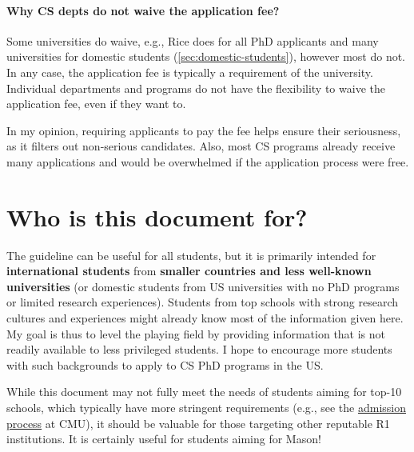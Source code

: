 \documentclass[oneside,11pt,dvipsnames]{book}
\def\sectioninfo#1{%
  \addcontentsline{toc}{sectioninfo}{%
    \noexpand\numberline{}\color{black}{#1}}%
}
\newcommand{\mycomment}[3][\color{blue}]{{#1{{#2}: {#3}}}}
\newcommand{\didi}[1]{\mycomment{Didier}{#1}}{}
\begin{document}


\paragraph{Why CS depts do not waive the application fee?}  Some universities do waive, e.g., Rice does for all PhD applicants and many universities for domestic students (\autoref{sec:domestic-students}), however most do not.  In any case, the application fee is typically a requirement of the university. Individual departments and programs do not have the flexibility to waive the application fee, even if they want to.

In my opinion, requiring applicants to pay the fee helps ensure their seriousness, as it filters out non-serious candidates. Also, most CS programs already receive many applications and would be overwhelmed if the application process were free.


\section{Who is this document for?}
\sectioninfo{This document is mainly intended for international students from smaller countries and domestic students from less well-known universities.}

The guideline can be useful for all students, but it is primarily intended for \textbf{international students} from \textbf{smaller countries and less well-known universities} (or domestic students from US universities with no PhD programs or limited research experiences). 
Students from top schools with strong research cultures and experiences might already know most of the information given here.
My goal is thus to level the playing field by providing information that is not readily available to less privileged students. 
I hope to encourage more students with such backgrounds to apply to CS PhD programs in the US.

While this document may not fully meet the needs of students aiming for top-10 schools, which typically have more stringent requirements (e.g., see the \href{https://da-data.blogspot.com/2015/03/reflecting-on-cs-graduate-admissions.html}{admission process} at CMU), it should be valuable for those targeting other reputable R1 institutions. It is certainly useful for students aiming for Mason!
\end{document}
